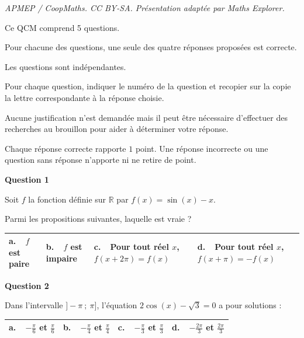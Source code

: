 \documentclass[10pt]{article}
\providecommand{\R}{\mathbb{R}}
\begin{document}
\noindent\textit{APMEP / CoopMaths. CC BY-SA. Présentation adaptée par Maths Explorer.}\par\medskip
\medskip

Ce QCM comprend 5 questions.

Pour chacune des questions, une seule des quatre réponses proposées est correcte.

Les questions sont indépendantes.

Pour chaque question, indiquer le numéro de la question et recopier sur la copie la lettre correspondante à la réponse choisie.

Aucune justification n'est demandée mais il peut être nécessaire d'effectuer des recherches au brouillon pour aider à déterminer votre réponse.

Chaque réponse correcte rapporte $1$ point. Une réponse incorrecte ou une question sans réponse n'apporte ni ne retire de point.

\medskip

\textbf{Question 1}

\medskip

Soit $f$ la fonction définie sur $\R$ par $f(x) = \sin(x) - x$. 

Parmi les propositions suivantes, laquelle est vraie  ?

\begin{center}
\begin{tabularx}{\linewidth}{|*{4}{X|}}\hline
\textbf{a.~~}$f$ est paire&\textbf{b.~~}$f$ est impaire&\textbf{c.~~}Pour tout réel $x$,\: $f(x +2\pi) = f(x)$&\textbf{d.~~}Pour tout réel $x$,\: $f(x +\pi) = - f(x)$\\ \hline
\end{tabularx}
\end{center}

\medskip

\textbf{Question 2}

\medskip

Dans l'intervalle $]-\pi~;~\pi]$, l'équation $2 \cos(x) - \sqrt{3} = 0$ a pour solutions :

\begin{center}
\begin{tabularx}{\linewidth}{|*{4}{X|}}\hline
\textbf{a.~~}$- \frac{\pi}{6}$ et $\frac{\pi}{6}$&\textbf{b.~~}$- \frac{\pi}{4}$ et $\frac{\pi}{4}$&\textbf{c.~~}$- \frac{\pi}{3}$ et $\frac{\pi}{3}$&\textbf{d.~~}$- \frac{2\pi}{3}$ et $\frac{2\pi}{3}$\\ \hline
\end{tabularx}
\end{center}
\medskip
\end{document}
